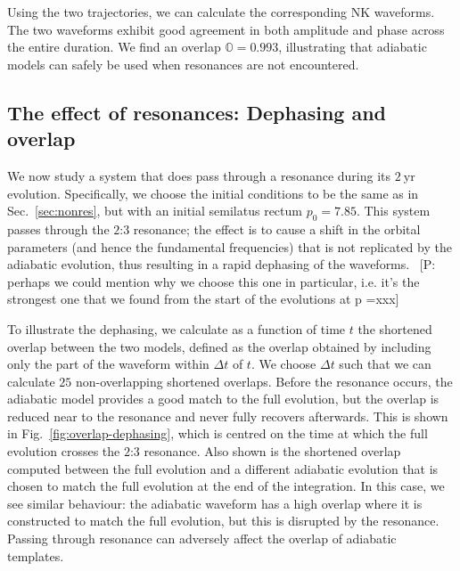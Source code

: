 \documentclass[aps,prd,amsfonts,amssymb,amsmath,nofootinbib,showpacs,superscriptaddress,twocolumn,floatfix]{revtex4-1}
\newcommand{\figref}[1]{Fig.~\ref{fig:#1}}
\newcommand{\secref}[1]{Sec.~\ref{sec:#1}}
\newcommand{\pcm}[1]{{\color{blue}~\textsf{[P: #1]}}}
\begin{document}
Using the two trajectories, we can calculate the corresponding NK waveforms. The two waveforms exhibit good agreement in both amplitude and phase across the entire duration. We find an overlap $\mathbb{O} = 0.993$, illustrating that adiabatic models can safely be used when resonances are not encountered.

\subsection{The effect of resonances: Dephasing and overlap}
\label{sec:effres-phase}

We now study a system that does pass through a resonance during its $2~\mathrm{yr}$ evolution. Specifically, we choose the initial conditions to be the same as in \secref{nonres}, but with an initial semilatus rectum $p_0 = 7.85$. This system passes through the $2$:$3$ resonance; the effect is to cause a shift in the orbital parameters (and hence the fundamental frequencies) that is not replicated by the adiabatic evolution, thus resulting in a rapid dephasing of the waveforms. \pcm{perhaps we could mention why we choose this one in particular, i.e. it's the strongest one that we found from the start of the evolutions at p =xxx}

To illustrate the dephasing, we calculate as a function of time $t$ the shortened overlap between the two models, defined as the overlap obtained by including only the part of the waveform within $\Delta t$ of $t$. We choose $\Delta t$ such that we can calculate $25$ non-overlapping shortened overlaps. Before the resonance occurs, the adiabatic model provides a good match to the full evolution, but the overlap is reduced near to the resonance and never fully recovers afterwards. This is shown in \figref{overlap-dephasing}, which is centred on the time at which the full evolution crosses the $2$:$3$ resonance. Also shown is the shortened overlap computed between the full evolution and a different adiabatic evolution that is chosen to match the full evolution at the end of the integration. In this case, we see similar behaviour: the adiabatic waveform has a high overlap where it is constructed to match the full evolution, but this is disrupted by the resonance. Passing through resonance can adversely affect the overlap of adiabatic templates.
\end{document}
